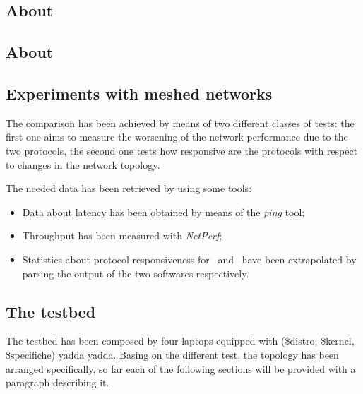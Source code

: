 \begin{multicols}{2}

    \subsection{About \batman}

    \subsection{About \olsr}

    \subsection{Experiments with meshed networks}

        The comparison has been achieved by means of two different classes
        of tests: the first one aims to measure the worsening of the network
        performance due to the two protocols, the second one tests how
        responsive are the protocols with respect to changes in the
        network topology.

        The needed data has been retrieved by using some tools:
        \begin{itemize}
        \item   Data about latency has been obtained by means of the
                \emph{ping} tool;
        \item   Throughput has been measured with
                \emph{NetPerf}\cite{bib:NetPerf};
        \item   Statistics about protocol responsiveness for \batman\ and
                \olsr\ have been extrapolated by parsing the output of the
                two softwares respectively.
        \end{itemize}

    \subsection{The testbed}

        The testbed has been composed by four laptops equipped with
        (\$distro, \$kernel, \$specifiche) yadda yadda. Basing on the
        different test, the topology has been arranged specifically, so
        far each of the following sections will be provided with a
        paragraph describing it.

\end{multicols}
